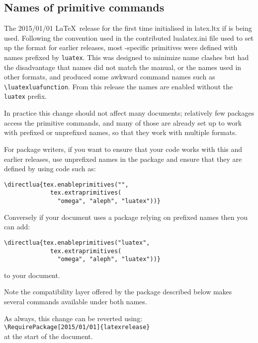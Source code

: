 \documentclass{ltnews}
\begin{document}
\subsection{Names of  primitive commands}

The 2015/01/01 \LaTeX\ release for the first time initialised
 in \textsf{latex.ltx} if  is being
used. Following the convention used in the contributed
\textsf{lualatex.ini} file used to set up the format for earlier
releases, most -specific primitives were defined with
names prefixed by \texttt{luatex}. This was designed to minimize name
clashes but had the disadvantage that names did not match the
 manual, or the names used in other formats, and
produced some awkward command names such as \verb|\luatexluafunction|.
From this release the names are enabled without the \texttt{luatex}
prefix.

In practice this change should not affect many documents; relatively
few packages access the primitive commands, and many of those are
already set up to work with prefixed or unprefixed names, so that they
work with multiple formats.

For package writers, if you want to ensure that your code works with
this and earlier releases, use unprefixed names in the package and
ensure that they are defined by using code such as:
\begin{verbatim}
\directlua{tex.enableprimitives("",
             tex.extraprimitives(
               "omega", "aleph", "luatex"))}
\end{verbatim}
Conversely if your document  uses a package relying on prefixed names
then you can add:
\begin{verbatim}
\directlua{tex.enableprimitives("luatex",
             tex.extraprimitives(
               "omega", "aleph", "luatex"))}
\end{verbatim}
to your document.

Note the compatibility layer offered by the  package
described below makes several commands available under both names.

As always, this change can be reverted using:\\
\verb|\RequirePackage[2015/01/01]{latexrelease}|\\
at the start of the document.
\end{document}

